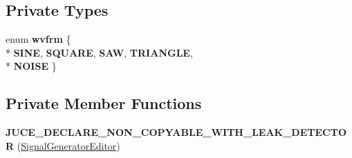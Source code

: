 \subsection*{Private Types}
\begin{DoxyCompactItemize}
\item 
enum {\bfseries wvfrm} \{ \\*
{\bfseries S\-I\-N\-E}, 
{\bfseries S\-Q\-U\-A\-R\-E}, 
{\bfseries S\-A\-W}, 
{\bfseries T\-R\-I\-A\-N\-G\-L\-E}, 
\\*
{\bfseries N\-O\-I\-S\-E}
 \}
\end{DoxyCompactItemize}
\subsection*{Private Member Functions}
\begin{DoxyCompactItemize}
\item 
\hypertarget{classSignalGeneratorEditor_a3583ca3f8821c4ed4885d0f84d07468d}{{\bfseries J\-U\-C\-E\-\_\-\-D\-E\-C\-L\-A\-R\-E\-\_\-\-N\-O\-N\-\_\-\-C\-O\-P\-Y\-A\-B\-L\-E\-\_\-\-W\-I\-T\-H\-\_\-\-L\-E\-A\-K\-\_\-\-D\-E\-T\-E\-C\-T\-O\-R} (\hyperlink{classSignalGeneratorEditor}{Signal\-Generator\-Editor})}\label{classSignalGeneratorEditor_a3583ca3f8821c4ed4885d0f84d07468d}

\end{DoxyCompactItemize}
